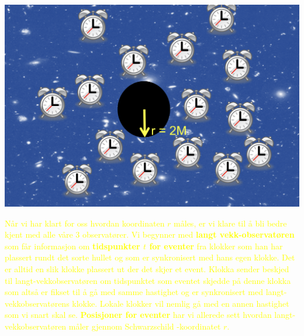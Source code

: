 \documentclass{beamer}
\renewcommand{\ss}{Schwarz\-schild }
\newcommand{\pagebutton}[1]{\setbeamertemplate{button}{\tikz\node[inner xsep = 5pt, draw = structure!90, fill = green(ryb), rounded corners = 8pt]{\color{amber}\Large\insertbuttontext};}\beamerbutton{#1}}
\begin{document}
\begin{frame}
{
\centerline{\includegraphics[scale=0.2]{media/shell3.png}}
\textcolor{yellow}{
Når vi har klart for oss hvordan koordinaten $r$ måles, er vi klare til å bli bedre kjent med alle våre 3 observatører. Vi begynner med {\bf langt vekk-observatøren} som får informasjon om {\bf tidspunkter $t$ for eventer} fra klokker som han har plassert rundt det sorte hullet og som er synkronisert med hans egen klokke. Det er alltid en slik klokke plassert ut der det skjer et event. Klokka sender beskjed til langt-vekkobservatøren om tidspunktet som eventet skjedde på denne klokka som altså er fikset til å gå med samme hastighet og er synkronisert med langt-vekkobservatørens klokke. Lokale klokker vil nemlig gå med en annen hastighet som vi snart skal se. {\bf Posisjoner for eventer} har vi allerede sett hvordan langt-vekkobservatøren måler gjennom \ss-koordinatet $r$.}
\hyperlink{denim_obs12}{\pagebutton{SIDE 51/73/73}}}


\end{frame}
\end{document}
